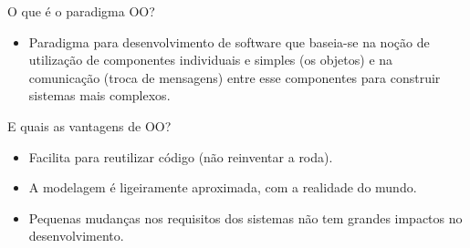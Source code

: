 \begin{frame}{O que é o paradigma OO?}
  \begin{itemize}
    \item Paradigma para desenvolvimento de software que baseia-se na noção de utilização de componentes individuais e simples (os objetos) e na comunicação (troca de mensagens) entre esse componentes para construir sistemas mais complexos.
  \end{itemize}
  \pause
  E quais as vantagens de OO?
  \begin{itemize}
    \item Facilita para reutilizar código (não reinventar a roda).
    \item A modelagem é ligeiramente aproximada, com a realidade do mundo.
    \item Pequenas mudanças nos requisitos dos sistemas não tem grandes impactos no desenvolvimento.
  \end{itemize}
\end{frame}